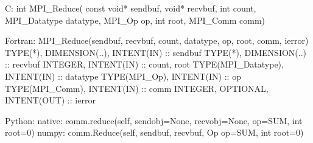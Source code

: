 C:
int MPI_Reduce(
    const void* sendbuf, void* recvbuf, int count, MPI_Datatype datatype,
    MPI_Op op, int root, MPI_Comm comm)

Fortran:
MPI_Reduce(sendbuf, recvbuf, count, datatype, op, root, comm, ierror)
TYPE(*), DIMENSION(..), INTENT(IN) :: sendbuf
TYPE(*), DIMENSION(..) :: recvbuf
INTEGER, INTENT(IN) :: count, root
TYPE(MPI_Datatype), INTENT(IN) :: datatype
TYPE(MPI_Op), INTENT(IN) :: op
TYPE(MPI_Comm), INTENT(IN) :: comm
INTEGER, OPTIONAL, INTENT(OUT) :: ierror

Python:
native:
comm.reduce(self, sendobj=None, recvobj=None, op=SUM, int root=0)
numpy:
comm.Reduce(self, sendbuf, recvbuf, Op op=SUM, int root=0)
